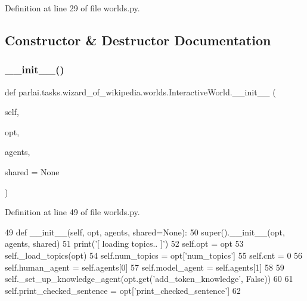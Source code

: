 Definition at line 29 of file worlds.\+py.



\subsection{Constructor \& Destructor Documentation}
\mbox{\label{classparlai_1_1tasks_1_1wizard__of__wikipedia_1_1worlds_1_1InteractiveWorld_a17330f1fd256bd53eafea1c7e119d77d}} 
\subsubsection{\texorpdfstring{\+\_\+\+\_\+init\+\_\+\+\_\+()}{\_\_init\_\_()}}
{\footnotesize\ttfamily def parlai.\+tasks.\+wizard\+\_\+of\+\_\+wikipedia.\+worlds.\+Interactive\+World.\+\_\+\+\_\+init\+\_\+\+\_\+ (\begin{DoxyParamCaption}\item[{}]{self,  }\item[{}]{opt,  }\item[{}]{agents,  }\item[{}]{shared = {\ttfamily None} }\end{DoxyParamCaption})}



Definition at line 49 of file worlds.\+py.


\begin{DoxyCode}
49     \textcolor{keyword}{def }\_\_init\_\_(self, opt, agents, shared=None):
50         super().\_\_init\_\_(opt, agents, shared)
51         print(\textcolor{stringliteral}{'[ loading topics.. ]'})
52         self.opt = opt
53         self.\_load\_topics(opt)
54         self.num\_topics = opt[\textcolor{stringliteral}{'num\_topics'}]
55         self.cnt = 0
56         self.human\_agent = self.agents[0]
57         self.model\_agent = self.agents[1]
58 
59         self.\_set\_up\_knowledge\_agent(opt.get(\textcolor{stringliteral}{'add\_token\_knowledge'}, \textcolor{keyword}{False}))
60 
61         self.print\_checked\_sentence = opt[\textcolor{stringliteral}{'print\_checked\_sentence'}]
62 
\end{DoxyCode}


